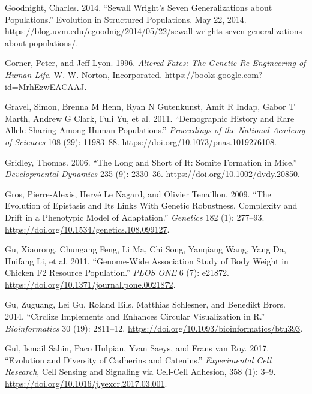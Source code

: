 \documentclass[
]{book}
\newlength{\cslhangindent}
\newlength{\cslentryspacingunit} %
\newenvironment{CSLReferences}[2] %
 {%
  \setlength{\parindent}{0pt}
  \ifodd #1
  \let\oldpar\par
  \def\par{\hangindent=\cslhangindent\oldpar}
  \fi
  \setlength{\parskip}{#2\cslentryspacingunit}
 }%
 {}
\begin{document}
\begin{CSLReferences}{1}{0}
\leavevmode{}%
Goodnight, Charles. 2014. {``Sewall {Wright}'s {Seven Generalizations} about {Populations}.''} {Evolution in Structured Populations}. May 22, 2014. \url{https://blog.uvm.edu/cgoodnig/2014/05/22/sewall-wrights-seven-generalizations-about-populations/}.

\leavevmode{}%
Gorner, Peter, and Jeff Lyon. 1996. \emph{Altered {Fates}: {The Genetic Re-Engineering} of {Human Life}}. {W. W. Norton, Incorporated}. \url{https://books.google.com?id=MrhEzwEACAAJ}.

\leavevmode{}%
Gravel, Simon, Brenna M Henn, Ryan N Gutenkunst, Amit R Indap, Gabor T Marth, Andrew G Clark, Fuli Yu, et al. 2011. {``Demographic History and Rare Allele Sharing Among Human Populations.''} \emph{Proceedings of the National Academy of Sciences} 108 (29): 11983--88. \url{https://doi.org/10.1073/pnas.1019276108}.

\leavevmode{}%
Gridley, Thomas. 2006. {``The Long and Short of It: {Somite} Formation in Mice.''} \emph{Developmental Dynamics} 235 (9): 2330--36. \url{https://doi.org/10.1002/dvdy.20850}.

\leavevmode{}%
Gros, Pierre-Alexis, Hervé Le Nagard, and Olivier Tenaillon. 2009. {``The {Evolution} of {Epistasis} and {Its Links With Genetic Robustness}, {Complexity} and {Drift} in a {Phenotypic Model} of {Adaptation}.''} \emph{Genetics} 182 (1): 277--93. \url{https://doi.org/10.1534/genetics.108.099127}.

\leavevmode{}%
Gu, Xiaorong, Chungang Feng, Li Ma, Chi Song, Yanqiang Wang, Yang Da, Huifang Li, et al. 2011. {``Genome-{Wide Association Study} of {Body Weight} in {Chicken F2 Resource Population}.''} \emph{PLOS ONE} 6 (7): e21872. \url{https://doi.org/10.1371/journal.pone.0021872}.

\leavevmode{}%
Gu, Zuguang, Lei Gu, Roland Eils, Matthias Schlesner, and Benedikt Brors. 2014. {``Circlize Implements and Enhances Circular Visualization in {R}.''} \emph{Bioinformatics} 30 (19): 2811--12. \url{https://doi.org/10.1093/bioinformatics/btu393}.

\leavevmode{}%
Gul, Ismail Sahin, Paco Hulpiau, Yvan Saeys, and Frans van Roy. 2017. {``Evolution and Diversity of Cadherins and Catenins.''} \emph{Experimental Cell Research}, Cell {Sensing} and {Signaling} via {Cell-Cell Adhesion}, 358 (1): 3--9. \url{https://doi.org/10.1016/j.yexcr.2017.03.001}.


\end{CSLReferences}
\end{document}
